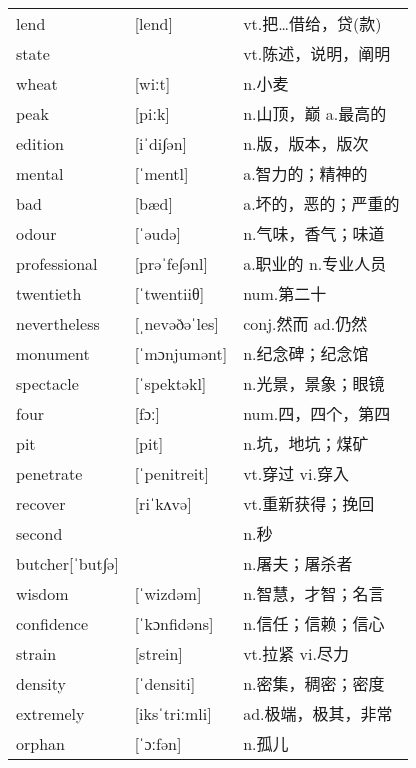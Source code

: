 \documentclass[a4paper]{article}
\begin{document}
\section{}
\begin{tabular}{l l l}

lend & [lend] & vt.把…借给，贷(款) \\
state &  & vt.陈述，说明，阐明 \\
wheat & [wiːt] & n.小麦 \\
peak & [piːk] & n.山顶，巅 a.最高的 \\
edition & [iˈdi∫ən] & n.版，版本，版次 \\
mental & [ˈmentl] & a.智力的；精神的 \\
bad & [bæd] & a.坏的，恶的；严重的 \\
odour & [ˈəudə] & n.气味，香气；味道 \\
professional & [prəˈfe∫ənl] & a.职业的 n.专业人员 \\
twentieth & [ˈtwentiiθ] & num.第二十 \\
nevertheless & [ˌnevəðəˈles] & conj.然而 ad.仍然 \\
monument & [ˈmɔnjumənt] & n.纪念碑；纪念馆 \\
spectacle & [ˈspektəkl] & n.光景，景象；眼镜 \\
four & [fɔː] & num.四，四个，第四 \\
pit & [pit] & n.坑，地坑；煤矿 \\
penetrate & [ˈpenitreit] & vt.穿过 vi.穿入 \\
recover & [riˈkʌvə] & vt.重新获得；挽回 \\
second &  & n.秒 \\
butcher[ˈbut∫ə] &  & n.屠夫；屠杀者 \\
wisdom & [ˈwizdəm] & n.智慧，才智；名言 \\
confidence & [ˈkɔnfidəns] & n.信任；信赖；信心 \\
strain & [strein] & vt.拉紧 vi.尽力 \\
density & [ˈdensiti] & n.密集，稠密；密度 \\
extremely & [iksˈtriːmli] & ad.极端，极其，非常 \\
orphan & [ˈɔːfən] & n.孤儿 \\

\end{tabular}
\end{document}
